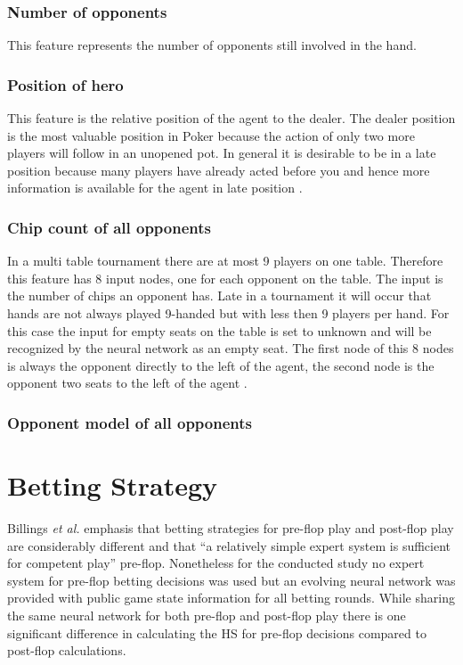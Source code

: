 \subsubsection{Number of opponents}
This feature represents the number of opponents still involved in the hand.
\subsubsection{Position of hero}
This feature is the relative position of the agent to the dealer. The dealer position is the most valuable position in Poker because the action of only two more players will follow in an unopened pot. In general it is desirable to be in a late position because many players have already acted before you and hence more information is available for the agent in late position \cite{evolutionary_methods}.
\subsubsection{Chip count of all opponents}
In a  multi table tournament there are at most 9 players on one table. Therefore this feature has 8 input nodes, one for each opponent on the table. The input is the number of chips an opponent has. Late in a tournament it will occur that hands are not always played 9-handed but with less then 9 players per hand. For this case the input for empty seats on the table is set to unknown and will be recognized by the neural network as an empty seat. The first node of this 8 nodes is always the opponent directly to the left of the agent, the second node is the opponent two seats to the left of the agent \cite{evolutionary_methods}. 
\subsubsection{Opponent model of all opponents}

\section{Betting Strategy}
Billings \textit{et al.} \cite[p.~210]{challenge_of_poker} emphasis that betting strategies for pre-flop play and post-flop play are considerably different and that \enquote{a relatively simple expert system is sufficient for competent play} pre-flop. Nonetheless for the conducted study no expert system for pre-flop betting decisions was used but an evolving neural network was provided with public game state information for all betting rounds. While sharing the same neural network for both pre-flop and post-flop play there is one significant difference in calculating the HS for pre-flop decisions compared to post-flop calculations.

